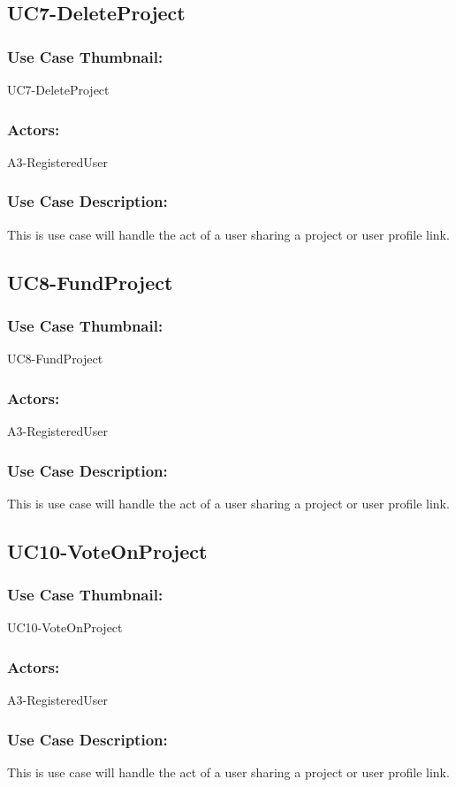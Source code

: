 \documentclass[11pt, openany]{report}
\begin{document}
\subsection{UC7-DeleteProject}
\label{sUC7}
\subsubsection*{Use Case Thumbnail:}
UC7-DeleteProject
\subsubsection*{Actors:}
A3-RegisteredUser
\subsubsection*{Use Case Description:}
This is use case will handle the act of a user sharing a project or user profile link.

\subsection{UC8-FundProject}
\label{sUC8}
\subsubsection*{Use Case Thumbnail:}
UC8-FundProject
\subsubsection*{Actors:}
A3-RegisteredUser
\subsubsection*{Use Case Description:}
This is use case will handle the act of a user sharing a project or user profile link.

\subsection{UC10-VoteOnProject}
\label{sUC10}
\subsubsection*{Use Case Thumbnail:}
UC10-VoteOnProject
\subsubsection*{Actors:}
A3-RegisteredUser
\subsubsection*{Use Case Description:}
This is use case will handle the act of a user sharing a project or user profile link.
\end{document}
